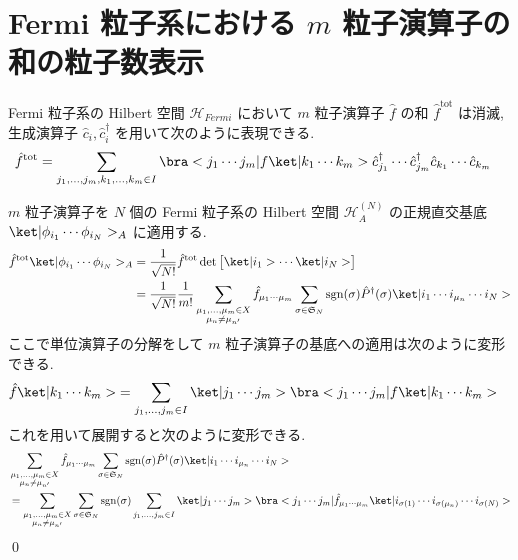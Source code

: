 \documentclass[uplatex,dvipdfmx,a4paper,11pt]{jlreq}
\makeatletter
\DeclareMathOperator{\sgn}{sgn}
\newcommand{\HH}{\mathcal{H}}
\renewcommand{\SS}{\mathfrak{S}}
\numberwithin{equation}{section}
\theoremstyle{definition}
\renewenvironment{proof}[1][\proofname]{\par
  \normalfont
  \topsep6\p@\@plus6\p@ \trivlist
  \item[\hskip\labelsep{\bfseries #1}\@addpunct{\bfseries}]\ignorespaces\quad\par
}{%
  \qed\endtrivlist\@endpefalse
}
\renewcommand\proofname{証明}
\makeatother
\begin{document}
\section{Fermi 粒子系における $m$ 粒子演算子の和の粒子数表示}
\begin{theorem}
  Fermi 粒子系の Hilbert 空間 $\HH_{Fermi}$ において $m$ 粒子演算子 $\hat{f}$ の和 $\hat{f}^{\mathrm{tot}}$ は消滅, 生成演算子 $\hat{c}_i, \hat{c}_i^\dagger$ を用いて次のように表現できる.
  \begin{align}
    \hat{f}^{\mathrm{tot}} & = \sum_{j_1,\ldots,j_m,k_1,\ldots,k_m\in I}\bra<j_1\cdots j_m|f\ket|k_1\cdots k_m>\hat{c}_{j_1}^\dagger\cdots\hat{c}_{j_m}^\dagger\hat{c}_{k_1}\cdots\hat{c}_{k_m}
  \end{align}
\end{theorem}
\begin{proof}
  $m$ 粒子演算子を $N$ 個の Fermi 粒子系の Hilbert 空間 $\HH_A^{(N)}$ の正規直交基底 $\ket|\phi_{i_1}\cdots\phi_{i_N}>_A$ に適用する.
  \begin{align}
    \hat{f}^{\mathrm{tot}}\ket|\phi_{i_1}\cdots\phi_{i_N}>_A & = \frac{1}{\sqrt{N!}}\hat{f}^{\mathrm{tot}}\det\begin{bmatrix}\ket|i_1>\cdots\ket|i_N>\end{bmatrix} \\
                                                             & = \frac{1}{\sqrt{N!}}\frac{1}{m!}\sum_{\substack{\mu_1,\ldots,\mu_m\in X                            \\ \mu_n\neq\mu_{n'}}}\hat{f}_{\mu_1\cdots\mu_m}\sum_{\sigma\in\SS_N}\sgn(\sigma)\hat{P}^\dagger(\sigma)\ket|i_1\cdots i_{\mu_n}\cdots i_N>
  \end{align}
  ここで単位演算子の分解をして $m$ 粒子演算子の基底への適用は次のように変形できる.
  \begin{align}
    \hat{f}\ket|k_1\cdots k_m> & = \sum_{j_1,\ldots,j_m\in I}\ket|j_1\cdots j_m>\bra<j_1\cdots j_m|f\ket|k_1\cdots k_m>
  \end{align}
  これを用いて展開すると次のように変形できる.
  \begin{align}
     & \sum_{\substack{\mu_1,\ldots,\mu_m\in X                                                              \\ \mu_n\neq\mu_{n'}}}\hat{f}_{\mu_1\cdots\mu_m}\sum_{\sigma\in\SS_N}\sgn(\sigma)\hat{P}^\dagger(\sigma)\ket|i_1\cdots i_{\mu_n}\cdots i_N> \\
     & = \sum_{\substack{\mu_1,\ldots,\mu_m\in X                                                            \\ \mu_n \neq \mu_{n'}}}\sum_{\sigma\in\SS_N}\sgn(\sigma)\sum_{j_1,\ldots,j_m\in I}\ket|j_1\cdots j_m>\bra<j_1\cdots j_m|\hat{f}_{\mu_1\cdots\mu_m}\ket|i_{\sigma(1)}\cdots i_{\sigma(\mu_n)}\cdots i_{\sigma(N)}> \\

\end{align}
\end{proof}
\end{document}
